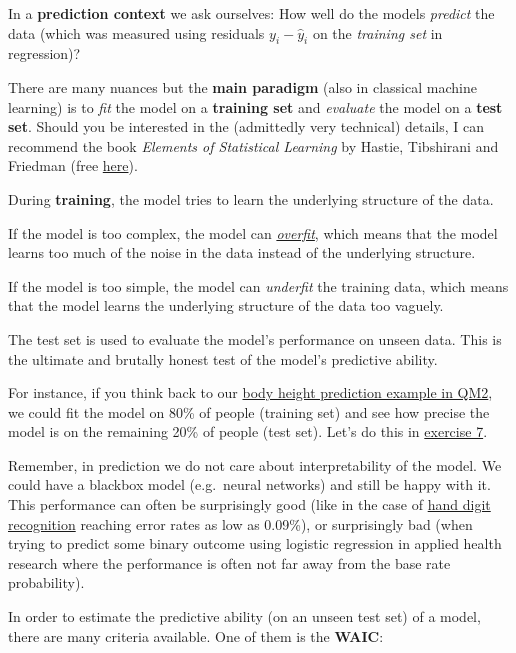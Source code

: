 \documentclass[
]{article}
\begin{document}
In a \textbf{prediction context} we ask ourselves: How well do the
models \emph{predict} the data (which was measured using residuals
\(y_i - \hat{y}_i\) on the \emph{training set} in regression)?

There are many nuances but the \textbf{main paradigm} (also in classical
machine learning) is to \emph{fit} the model on a \textbf{training set}
and \emph{evaluate} the model on a \textbf{test set}. Should you be
interested in the (admittedly very technical) details, I can recommend
the book \emph{Elements of Statistical Learning} by Hastie, Tibshirani
and Friedman (free
\href{https://www.sas.upenn.edu/~fdiebold/NoHesitations/BookAdvanced.pdf}{here}).

During \textbf{training}, the model tries to learn the underlying
structure of the data.

If the model is too complex, the model can
\href{https://miro.medium.com/v2/resize:fit:1400/format:webp/1*_7OPgojau8hkiPUiHoGK_w.png}{\emph{overfit}},
which means that the model learns too much of the noise in the data
instead of the underlying structure.

If the model is too simple, the model can \emph{underfit} the training
data, which means that the model learns the underlying structure of the
data too vaguely.

The test set is used to evaluate the model's performance on unseen data.
This is the ultimate and brutally honest test of the model's predictive
ability.

For instance, if you think back to our
\href{https://jdegenfellner.github.io/Script_QM2_ZHAW/multiple-linear-regression.html\#adding_transformed_predictor_bayes}{body
height prediction example in QM2}, we could fit the model on 80\% of
people (training set) and see how precise the model is on the remaining
20\% of people (test set). Let's do this in
\hyperref[exercise7_LMM]{exercise 7}.

Remember, in prediction we do not care about interpretability of the
model. We could have a blackbox model (e.g.~neural networks) and still
be happy with it. This performance can often be surprisingly good (like
in the case of
\href{https://en.wikipedia.org/wiki/MNIST_database\#Classifiers}{hand
digit recognition} reaching error rates as low as 0.09\%), or
surprisingly bad (when trying to predict some binary outcome using
logistic regression in applied health research where the performance is
often not far away from the base rate probability).

In order to estimate the predictive ability (on an unseen test set) of a
model, there are many criteria available. One of them is the
\textbf{WAIC}:
\end{document}
